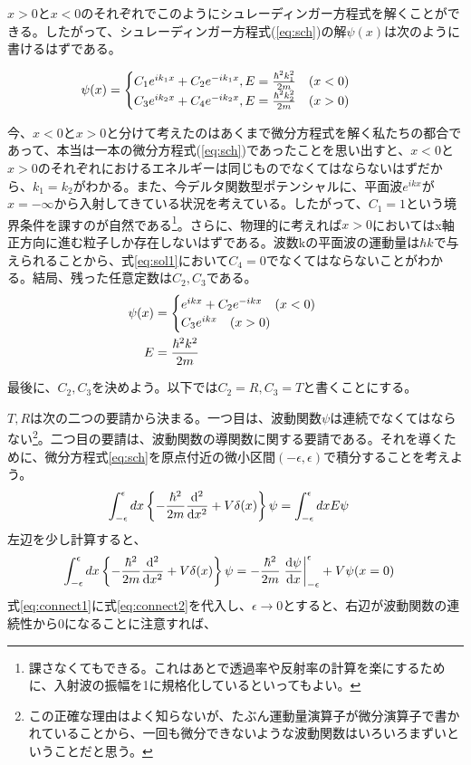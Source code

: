 \documentclass[uplatex,dvipdfmx]{jsarticle}
\begin{document}
$x>0$と$x<0$のそれぞれでこのようにシュレーディンガー方程式を解くことができる。したがって、シュレーディンガー方程式(\ref{eq:sch})の解$\psi(x)$は次のように書けるはずである。

\begin{align}
    \psi(x) &= \begin{cases}
        C_1 e^{ik_1x} + C_2 e^{-ik_1x}, E=\frac{\hbar^2k_1^2}{2m}  \qq{$(x<0)$} \\
        C_3 e^{ik_2x} + C_4 e^{-ik_2x}, E=\frac{\hbar^2k_2^2}{2m}  \qq{$(x>0)$} \label{eq:sol1}
    \end{cases}    
\end{align}

今、$x<0$と$x>0$と分けて考えたのはあくまで微分方程式を解く私たちの都合であって、本当は一本の微分方程式(\ref{eq:sch})であったことを思い出すと、$x<0$と$x>0$のそれぞれにおけるエネルギーは同じものでなくてはならないはずだから、$k_1 = k_2$がわかる。また、今デルタ関数型ポテンシャルに、平面波$e^{ikx}$が$x=-\infty$から入射してきている状況を考えている。したがって、$C_1=1$という境界条件を課すのが自然である\footnote{課さなくてもできる。これはあとで透過率や反射率の計算を楽にするために、入射波の振幅を1に規格化しているといってもよい。}。さらに、物理的に考えれば$x>0$においてはx軸正方向に進む粒子しか存在しないはずである。波数kの平面波の運動量は$\hbar k$で与えられることから、式\ref{eq:sol1}において$C_4=0$でなくてはならないことがわかる。結局、残った任意定数は$C_2, C_3$である。
\begin{align}
    \psi(x) &= \begin{cases}
        e^{ikx} + C_2 e^{-ikx} \qq{$(x<0)$} \\
        C_3 e^{ikx} \qq{$(x>0)$} \label{eq:sol2}
    \end{cases} \\
    E &= \frac{\hbar^2k^2}{2m}
\end{align}


\vspace{0.5cm}

最後に、$C_2, C_3$を決めよう。以下では$C_2 = R, C_3 = T$と書くことにする。

$T, R$は次の二つの要請から決まる。一つ目は、波動関数$\psi$は連続でなくてはならない\footnote{この正確な理由はよく知らないが、たぶん運動量演算子が微分演算子で書かれていることから、一回も微分できないような波動関数はいろいろまずいということだと思う。}。二つ目の要請は、波動関数の導関数に関する要請である。それを導くために、微分方程式\ref{eq:sch}を原点付近の微小区間$(-\epsilon, \epsilon)$で積分することを考えよう。
\begin{align}
    \int_{-\epsilon}^{\epsilon}dx \left\{-\frac{\hbar^2}{2m} \dv[2]{}{x} + V\delta(x) \right\}\psi &= \int_{-\epsilon}^{\epsilon} dx E\psi \label{eq:connect1}
\end{align}
左辺を少し計算すると、
\begin{align}
    \int_{-\epsilon}^{\epsilon} dx \left\{-\frac{\hbar^2}{2m} \dv[2]{}{x} + V\delta(x) \right\}\psi &= 
        -\frac{\hbar^2}{2m} \eval{\dv{\psi}{x}}_{-\epsilon}^{\epsilon} + V\psi(x=0) \label{eq:connect2}
\end{align}
式\ref{eq:connect1}に式\ref{eq:connect2}を代入し、$\epsilon \rightarrow 0$とすると、右辺が波動関数の連続性から0になることに注意すれば、
\end{document}
